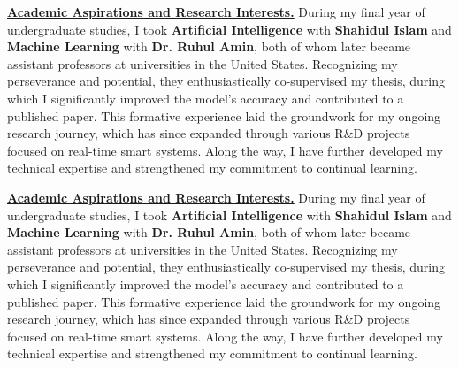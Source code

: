 \textbf{\underline{Academic Aspirations and Research Interests.}}
During my final year of undergraduate studies, I took \textbf{Artificial Intelligence} with \textbf{Shahidul Islam}
and \textbf{Machine Learning} with \textbf{Dr. Ruhul Amin}, both of whom later became assistant professors
at universities in the United States.
Recognizing my perseverance and potential, they enthusiastically co-supervised my thesis, during which I significantly
improved the model’s accuracy and contributed to a published paper.
This formative experience laid the groundwork for my ongoing research journey, which has since expanded through various R\&D projects
focused on real-time smart systems.
Along the way, I have further developed my technical expertise and strengthened my commitment to continual learning.


\textbf{\underline{Academic Aspirations and Research Interests.}}
During my final year of undergraduate studies, I took \textbf{Artificial Intelligence} with \textbf{Shahidul Islam}
and \textbf{Machine Learning} with \textbf{Dr. Ruhul Amin}, both of whom later became assistant professors
at universities in the United States.
Recognizing my perseverance and potential, they enthusiastically co-supervised my thesis, during which I significantly
improved the model’s accuracy and contributed to a published paper.
This formative experience laid the groundwork for my ongoing research journey, which has since expanded through various R\&D projects
focused on real-time smart systems.
Along the way, I have further developed my technical expertise and strengthened my commitment to continual learning.